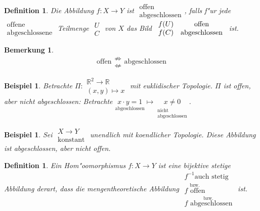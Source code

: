 \documentclass[a4paper,12pt,numbers=noenddot,parskip=full]{scrartcl}
\newcommand{\setR}{\mathbb{R}}
\theoremstyle{dotless}
\newtheorem{definition}[theorem]{Definition}
\newtheorem{example}[theorem]{Beispiel}
\newtheorem{remark}[theorem]{Bemerkung}
\begin{document}
\begin{definition}
	Die Abbildung $f: X \longrightarrow Y$ ist $\begin{array}{c}
		\text{offen}\\
		\text{abgeschlossen}
	\end{array}$, falls f"ur jede $\begin{array}{c}
		\text{offene}\\
		\text{abgeschlossene}
	\end{array}$ Teilmenge $\begin{array}{c}
		U\\
		C
	\end{array}$ von $X$ das Bild $\begin{array}{c c}
		f(U) &\text{offen}\\
		f(C) &\text{abgeschlossen}
	\end{array}$ ist.
\end{definition}
\begin{remark}
	\begin{equation*}
		\text{offen} \begin{array}{c}
			\not\Longrightarrow\\
			\not\Longleftarrow
		\end{array} \text{abgeschlossen}
	\end{equation*}
\end{remark}
\begin{example}
	Betrachte $\Pi : \begin{array}{c}
		\setR^2 \longrightarrow \setR\\
		(x,y) \longmapsto x
	\end{array}$ mit euklidischer Topologie. $\Pi$ ist offen, aber nicht abgeschlossen: Betrachte $\underset{\text{abgeschlossen}}{x \cdot y = 1} \mapsto \underset{\substack{\text{nicht}\\ \text{abgeschlossen}}}{x \neq 0}$.
\end{example}
\begin{example}
	Sei $\begin{array}{c}
		X \longrightarrow Y\\
		\text{konstant}
	\end{array}$ unendlich mit koendlicher Topologie. Diese Abbildung ist abgeschlossen, aber nicht offen.
\end{example}
\begin{definition}
	Ein Hom"oomorphismus $f: X \longrightarrow Y$ ist eine bijektive stetige Abbildung derart, dass die mengentheoretische Abbildung $\begin{array}{c}
		f^{-1} \text{auch stetig}\\
		\overset{\text{bzw.}}{f \text{ offen}}\\
		\overset{\text{bzw.}}{f \text{ abgeschlossen}}
	\end{array}$ ist.
\end{definition}
\end{document}
